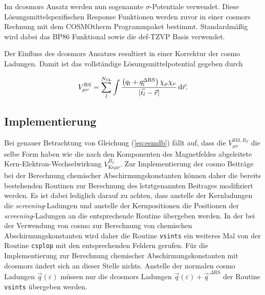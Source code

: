 Im \ac{dcosmors} Ansatz werden nun sogenannte $\sigma$-Potentiale verwendet. Diese Lösungsmittelspezifischen Response Funktionen werden zuvor in einer \ac{cosmors} Rechnung mit dem COSMOtherm Programmpaket\supercite{cosmotherm,eckert2002fast} bestimmt. Standardmäßig wird dabei das BP86 Funktional sowie die def-TZVP Basis verwendet. 

Der Einfluss des \ac{dcosmors} Ansatzes resultiert in einer Korrektur der \ac{cosmo} Ladungen. \supercite{sinnecker2006calculation} Damit ist das vollständige Lösungsmittelpotential gegeben durch

\begin{equation}
V_{\mu\nu}^{\textrm{RS}}=\sum_l^{N_{\textrm{SL}}}\int\frac{\left(q_l+q_l^{\Delta \textrm{RS}}\right)\chi_\mu\chi_\nu}{\vert\vec{t}_l-\vec{r}\vert}\mathop{}\!\mathrm{d}\vec{r}.
\end{equation}
	 
	\subsection{Implementierung}
	Bei genauer Betrachtung von Gleichung (\ref{eq:esmdb}) fällt auf, dass die $V_{\mu\nu}^{\textrm{SM},B_\beta}$ die selbe Form haben wie die nach den Komponenten des Magnetfeldes abgeleitete Kern-Elektron-Wechselwirkung $V_{\textrm{Ke}\mu\nu}^{B_\beta}$. Zur Implementierung der \ac{cosmo} Beiträge bei der Berechnung chemischer Abschirmungskonstanten können daher die bereits bestehenden Routinen zur Berechnung des letztgenannten Beitrages modifiziert werden. Es ist dabei lediglich darauf zu achten, dass anstelle der Kernladungen die \textit{screening}-Ladungen und anstelle der Kernpositionen die Positionen der \textit{screening}-Ladungen an die entsprechende Routine übergeben werden. In der bei der Verwendung von \ac{cosmo} zur Berechnung von chemischen Abschirmungskonstanten wird daher die Routine \texttt{vsints} ein weiteres Mal von der Routine \texttt{csplop} mit den entsprechenden Feldern gerufen. Für die Implementierung zur Berechnung chemischer Abschirmungskonstanten mit \ac{dcosmors} ändert sich an dieser Stelle nichts. Anstelle der normalen \ac{cosmo} Ladungen $\vec{q}(\varepsilon)$ müssen nur die \ac{dcosmors} Ladungen $\vec{q}(\varepsilon)+\vec{q}^{\,\Delta\textrm{RS}}$ der Routine \texttt{vsints} übergeben werden.
	
